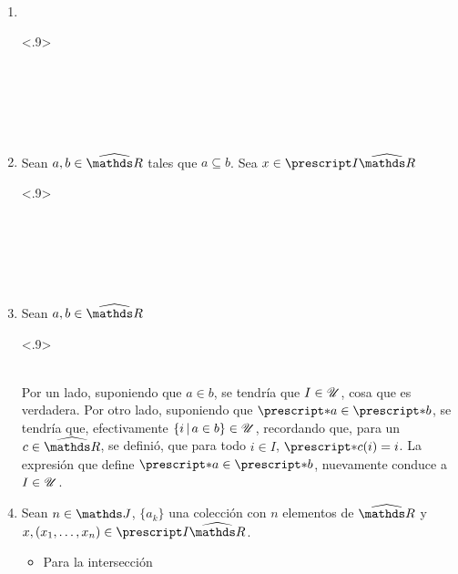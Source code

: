 \begin{demo}~
  \begin{enumerate}
    \item~
          \begin{longderivation}<.9>
              \\
            \equiv\\
              \\
            \equiv\\
              \wff{ \varnothing \in \U }\\
            \equiv\\
          \end{longderivation}
    \item Sean $a,b\in\Rh$ tales que $a\subseteq b$. Sea $x\in\IRh$
          \begin{longderivation}<.9>
              \\
            \equiv\\
              \\
            \\
              \\
            \equiv\\
          \end{longderivation}
    \item Sean $a,b\in\Rh$
          \begin{longderivation}<.9>
              \\
            \equiv\\
          \end{longderivation}
          Por un lado, suponiendo que $a\in b$, se tendría que $I\in\mathscr{U}$,
          cosa que es verdadera. Por otro lado, suponiendo que $\st{a} \in \st{b}$,
          se tendría que, efectivamente $\{i\,|\,a \in b\}\in\mathscr{U}$, recordando que,
          para un $c\in\Rh$, se definió, que para todo $i\in I$, $\st{c}(i) = i$.
          La expresión que define $\st{a} \in \st{b}$, nuevamente conduce a $I\in\mathscr{U}$.
    \item Sean $n\in\J$, $\{a_k\}$ una colección con $n$ elementos de
          $\Rh$ y $x, (x_1,\dots,x_n)\in\IRh$.
          \begin{itemize}
            \item Para la intersección
            

\end{itemize}
\end{enumerate}
\end{demo}
